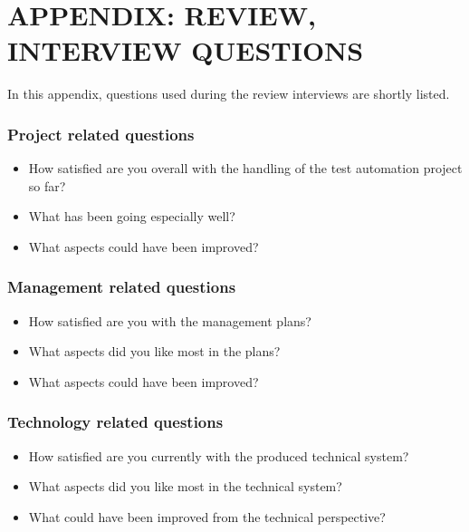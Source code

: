 \chapter{APPENDIX: REVIEW, INTERVIEW QUESTIONS}\label{appendix:review_interview_questions}

In this appendix, questions used during the review interviews are shortly listed.

\subsection*{Project related questions}
\begin{itemize}[noitemsep]
	\item How satisfied are you overall with the handling of the test automation project so far?
	\item What has been going especially well?
	\item What aspects could have been improved?
\end{itemize}

\subsection*{Management related questions}
\begin{itemize}[noitemsep]
	\item How satisfied are you with the management plans?
	\item What aspects did you like most in the plans?
	\item What aspects could have been improved?
\end{itemize}

\subsection*{Technology related questions}
\begin{itemize}[noitemsep]
	\item How satisfied are you currently with the produced technical system?
	\item What aspects did you like most in the technical system?
	\item What could have been improved from the technical perspective?
\end{itemize}